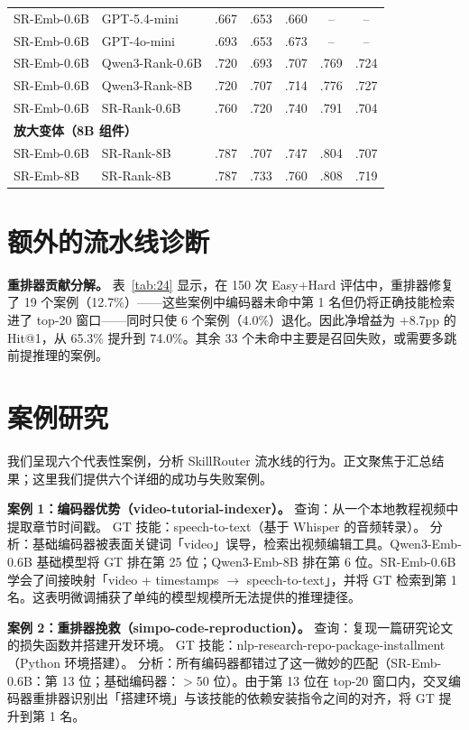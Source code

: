 \documentclass[11pt,UTF8,fontset=fandol]{ctexart}
\makeatletter
\newcommand{\Hit}{Hit@1}
\makeatother
\begin{document}
\begin{table}[H]
\begin{tabular}{llccccc}
SR-Emb-0.6B & GPT-5.4-mini & .667 & .653 & .660 & -- & -- \\
SR-Emb-0.6B & GPT-4o-mini & .693 & .653 & .673 & -- & -- \\
SR-Emb-0.6B & Qwen3-Rank-0.6B & .720 & .693 & .707 & .769 & .724 \\
SR-Emb-0.6B & Qwen3-Rank-8B & .720 & .707 & .714 & .776 & .727 \\
SR-Emb-0.6B & SR-Rank-0.6B & .760 & .720 & .740 & .791 & .704 \\
\multicolumn{7}{l}{\textbf{放大变体（8B 组件）}} \\
SR-Emb-0.6B & SR-Rank-8B & .787 & .707 & .747 & .804 & .707 \\
SR-Emb-8B & SR-Rank-8B & .787 & .733 & .760 & .808 & .719 \\
\bottomrule
\end{tabular}
\label{tab:21}
\end{table}

\section{额外的流水线诊断}

\textbf{重排器贡献分解。} 表~\ref{tab:24} 显示，在 150 次 Easy+Hard 评估中，重排器修复了 19 个案例（12.7\%）——这些案例中编码器未命中第 1 名但仍将正确技能检索进了 top-20 窗口——同时只使 6 个案例（4.0\%）退化。因此净增益为 $+8.7$pp 的 \Hit{}，从 65.3\% 提升到 74.0\%。其余 33 个未命中主要是召回失败，或需要多跳前提推理的案例。

\section{案例研究}

我们呈现六个代表性案例，分析 SkillRouter 流水线的行为。正文聚焦于汇总结果；这里我们提供六个详细的成功与失败案例。

\textbf{案例 1：编码器优势（video-tutorial-indexer）。} 查询：从一个本地教程视频中提取章节时间戳。
GT 技能：speech-to-text（基于 Whisper 的音频转录）。
分析：基础编码器被表面关键词「video」误导，检索出视频编辑工具。Qwen3-Emb-0.6B 基础模型将 GT 排在第 25 位；Qwen3-Emb-8B 排在第 6 位。SR-Emb-0.6B 学会了间接映射「video + timestamps $\rightarrow$ speech-to-text」，并将 GT 检索到第 1 名。这表明微调捕获了单纯的模型规模所无法提供的推理捷径。

\textbf{案例 2：重排器挽救（simpo-code-reproduction）。} 查询：复现一篇研究论文的损失函数并搭建开发环境。
GT 技能：nlp-research-repo-package-installment（Python 环境搭建）。
分析：所有编码器都错过了这一微妙的匹配（SR-Emb-0.6B：第 13 位；基础编码器：$>$50 位）。由于第 13 位在 top-20 窗口内，交叉编码器重排器识别出「搭建环境」与该技能的依赖安装指令之间的对齐，将 GT 提升到第 1 名。
\end{document}
